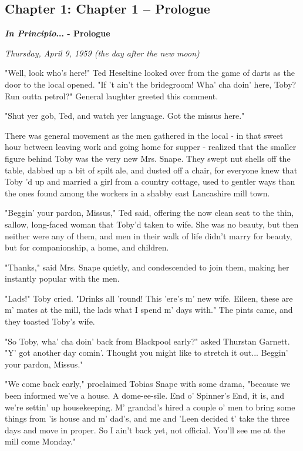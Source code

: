 \documentclass[a4paper,11pt]{article}
\begin{document}
\subsection{Chapter 1: Chapter 1 – Prologue}

\emph{\textbf{In Principio}}\textbf{... - Prologue}

\emph{Thursday, April 9, 1959 (the day after the new moon)}

"Well, look who's here!" Ted Heseltine looked over from the game of darts as the door to the local opened. "If 't ain't the bridegroom! Wha' cha doin' here, Toby? Run outta petrol?" General laughter greeted this comment.

"Shut yer gob, Ted, and watch yer language. Got the missus here."

There was general movement as the men gathered in the local - in that sweet hour between leaving work and going home for supper - realized that the smaller figure behind Toby was the very new Mrs. Snape. They swept nut shells off the table, dabbed up a bit of spilt ale, and dusted off a chair, for everyone knew that Toby 'd up and married a girl from a country cottage, used to gentler ways than the ones found among the workers in a shabby east Lancashire mill town.

"Beggin' your pardon, Missus," Ted said, offering the now clean seat to the thin, sallow, long-faced woman that Toby'd taken to wife. She was no beauty, but then neither were any of them, and men in their walk of life didn't marry for beauty, but for companionship, a home, and children.

"Thanks," said Mrs. Snape quietly, and condescended to join them, making her instantly popular with the men.

"Lads!" Toby cried. "Drinks all 'round! This 'ere's m' new wife. Eileen, these are m' mates at the mill, the lads what I spend m' days with." The pints came, and they toasted Toby's wife.

"So Toby, wha' cha doin' back from Blackpool early?" asked Thurstan Garnett. "Y' got another day comin'. Thought you might like to stretch it out... Beggin' your pardon, Missus."

"We come back early," proclaimed Tobias Snape with some drama, "because we been informed we've a house. A dome-ee-sile. End o' Spinner's End, it is, and we're settin' up housekeeping. M' grandad's hired a couple o' men to bring some things from 'is house and m' dad's, and me and 'Leen decided t' take the three days and move in proper. So I ain't back yet, not official. You'll see me at the mill come Monday."
\end{document}
